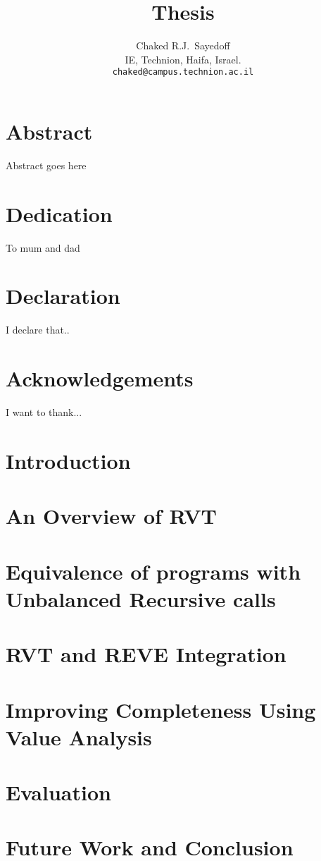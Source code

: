 \documentclass[12pt]{report}
\title{Thesis}
\author{
  Chaked R.J.~Sayedoff \\
  IE, Technion, Haifa, Israel.\\
    \texttt{chaked@campus.technion.ac.il}\\
}
\begin{document}
\maketitle
\chapter*{Abstract}
Abstract goes here

\chapter*{Dedication}
To mum and dad

\chapter*{Declaration}
I declare that..

\chapter*{Acknowledgements}
I want to thank...

\tableofcontents

\chapter{Introduction}


\chapter{An Overview of RVT}


\chapter{Equivalence of programs with Unbalanced Recursive calls}


\chapter{RVT and REVE Integration}


\chapter{Improving Completeness Using Value Analysis}


\chapter{Evaluation}


\chapter{Future Work and Conclusion}






  

\end{document}
